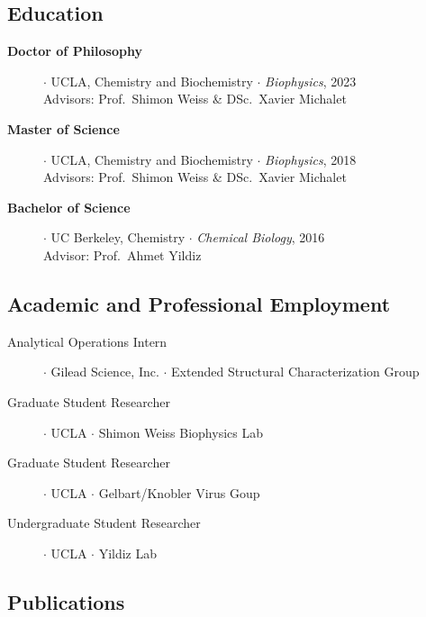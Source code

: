 \subsection*{Education}

\begin{description}
    \item[\textbf{Doctor of Philosophy}] $\cdotp$ UCLA, Chemistry and Biochemistry $\cdotp$ \textit{Biophysics}, 2023 \\
    Advisors: Prof.~Shimon Weiss \& DSc.~Xavier Michalet
    
    \item[\textbf{Master of Science}] $\cdotp$ UCLA, Chemistry and Biochemistry $\cdotp$ \textit{Biophysics}, 2018 \\
    Advisors: Prof.~Shimon Weiss \& DSc.~Xavier Michalet
    
    \item[\textbf{Bachelor of Science}] $\cdotp$ UC Berkeley, Chemistry $\cdotp$ \textit{Chemical Biology}, 2016 \\
    Advisor: Prof.~Ahmet Yildiz
\end{description}
\vspace{1em}

\subsection*{Academic and Professional Employment}

\begin{description}
    \item[Analytical Operations Intern] $\cdotp$ Gilead Science, Inc. $\cdotp$ Extended Structural Characterization Group
    
    \item[Graduate Student Researcher] $\cdotp$ UCLA $\cdotp$ Shimon Weiss Biophysics Lab

    \item[Graduate Student Researcher] $\cdotp$ UCLA $\cdotp$ Gelbart/Knobler Virus Goup

    \item[Undergraduate Student Researcher] $\cdotp$ UCLA $\cdotp$ Yildiz Lab
\end{description}
\vspace{1em}

\subsection*{Publications}

